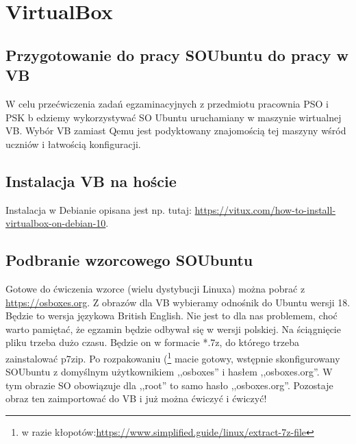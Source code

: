 \section{VirtualBox}
\subsection{Przygotowanie do pracy SOUbuntu do pracy w VB}
W celu przećwiczenia zadań egzaminacyjnych z przedmiotu pracownia PSO i PSK b edziemy wykorzystywać SO Ubuntu uruchamiany w maszynie wirtualnej VB. Wybór VB zamiast Qemu jest podyktowany znajomością tej maszyny wśród uczniów i łatwością konfiguracji.\newline
\subsection{Instalacja VB na hoście}
Instalacja w Debianie opisana jest np. tutaj: \url{https://vitux.com/how-to-install-virtualbox-on-debian-10}.\newline
\subsection{Podbranie wzorcowego SOUbuntu}
Gotowe do ćwiczenia wzorce (wielu dystybucji Linuxa) można pobrać z \url{https://osboxes.org}. Z obrazów dla VB wybieramy odnośnik do Ubuntu wersji 18. Będzie to wersja językowa British English. Nie jest to dla nas problemem, choć warto pamiętać, że egzamin będzie odbywał się w wersji polskiej. Na ściągnięcie pliku trzeba dużo czasu. Będzie on w formacie *.7z, do którego trzeba zainstalować p7zip. Po rozpakowaniu (\footnote{w razie kłopotów:\url{https://www.simplified.guide/linux/extract-7z-file}} macie gotowy, wstępnie skonfigurowany SOUbuntu z domyślnym użytkownikiem ,,osboxes'' i hasłem ,,osboxes.org''. W tym obrazie SO obowiązuje dla ,,root'' to samo hasło ,,osboxes.org''. Pozostaje obraz ten zaimportować do VB i już można ćwiczyć i ćwiczyć!
